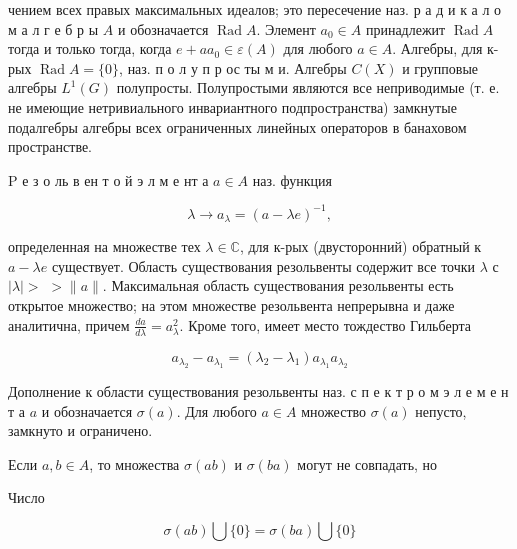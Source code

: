 \documentclass[10pt]{article}
\begin{document}
чением всех правых максимальных идеалов; это пересечение наз. р а д и к а л о м а л г е б р ы $A$ и обозначается $\operatorname{Rad} A$. Элемент $a_{0} \in A$ принадлежит $\operatorname{Rad} A$ тогда и только тогда, когда $e+a a_{0} \in \varepsilon(A)$ для любого $a \in A$. Алгебры, для к-рых $\operatorname{Rad} A=\{0\}$, наз. п о л у п р ос ты м и. Алгебры $C(X)$ и групповые алгебры $L^{1}(G)$ полупросты. Полупростыми являются все неприводимые (т. е. не имеющие нетривиального инвариантного подпространства) замкнутые подалгебры алгебры всех ограниченных линейных операторов в банаховом пространстве.



$\mathrm{P}$ е $з$ о ль в ен т о й э л м е нт а $a \in A$ наз. функция



\[

\lambda \longrightarrow a_{\lambda}=(a-\lambda e)^{-1},

\]



определенная на множестве тех $\lambda \in \mathbb{C}$, для к-рых (двусторонний) обратный к $a-\lambda e$ существует. Область существования резольвенты содержит все точки $\lambda$ с $|\lambda|>$ $>\|a\|$. Максимальная область существования резольвенты есть открытое множество; на этом множестве резольвента непрерывна и даже аналитична, причем $\frac{d a}{d \lambda}=a_{\lambda}^{2}$. Кроме того, имеет место тождество Гильберта



\[

a_{\lambda_{2}}-a_{\lambda_{1}}=\left(\lambda_{2}-\lambda_{1}\right) a_{\lambda_{1}} a_{\lambda_{2}}

\]



Дополнение к области существования резольвенты наз. с п е к т р о м э л е м е н т а $a$ и обозначается $\sigma(a)$. Для любого $a \in A$ множество $\sigma(a)$ непусто, замкнуто и ограничено.



Если $a, b \in A$, то множества $\sigma(a b)$ и $\sigma(b a)$ могут не совпадать, но



Число



\[

\sigma(a b) \bigcup\{0\}=\sigma(b a) \bigcup\{0\}

\]
\end{document}
